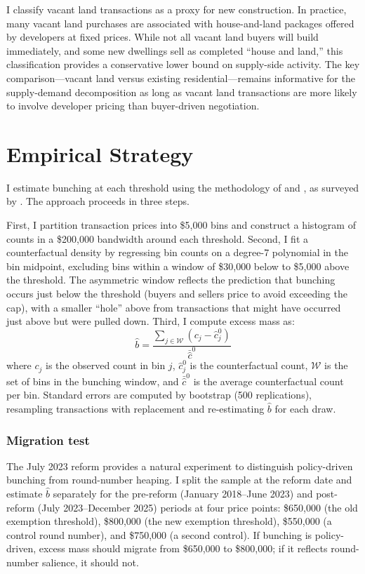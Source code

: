 \documentclass[12pt]{article}
\begin{document}


I classify vacant land transactions as a proxy for new construction. In practice, many vacant land purchases are associated with house-and-land packages offered by developers at fixed prices. While not all vacant land buyers will build immediately, and some new dwellings sell as completed ``house and land,'' this classification provides a conservative lower bound on supply-side activity. The key comparison---vacant land versus existing residential---remains informative for the supply-demand decomposition as long as vacant land transactions are more likely to involve developer pricing than buyer-driven negotiation.


\section{Empirical Strategy}

I estimate bunching at each threshold using the methodology of \citet{chetty2011adjustment} and \citet{kleven2013using}, as surveyed by \citet{kleven2016bunching}. The approach proceeds in three steps.

First, I partition transaction prices into \$5,000 bins and construct a histogram of counts in a \$200,000 bandwidth around each threshold. Second, I fit a counterfactual density by regressing bin counts on a degree-7 polynomial in the bin midpoint, excluding bins within a window of \$30,000 below to \$5,000 above the threshold. The asymmetric window reflects the prediction that bunching occurs just below the threshold (buyers and sellers price to avoid exceeding the cap), with a smaller ``hole'' above from transactions that might have occurred just above but were pulled down. Third, I compute excess mass as:
\begin{equation}
\hat{b} = \frac{\sum_{j \in \mathcal{W}} (c_j - \hat{c}_j^0)}{\bar{\hat{c}}^0}
\end{equation}
where $c_j$ is the observed count in bin $j$, $\hat{c}_j^0$ is the counterfactual count, $\mathcal{W}$ is the set of bins in the bunching window, and $\bar{\hat{c}}^0$ is the average counterfactual count per bin. Standard errors are computed by bootstrap (500 replications), resampling transactions with replacement and re-estimating $\hat{b}$ for each draw.

\subsubsection*{Migration test} The July 2023 reform provides a natural experiment to distinguish policy-driven bunching from round-number heaping. I split the sample at the reform date and estimate $\hat{b}$ separately for the pre-reform (January 2018--June 2023) and post-reform (July 2023--December 2025) periods at four price points: \$650,000 (the old exemption threshold), \$800,000 (the new exemption threshold), \$550,000 (a control round number), and \$750,000 (a second control). If bunching is policy-driven, excess mass should migrate from \$650,000 to \$800,000; if it reflects round-number salience, it should not.
\end{document}
